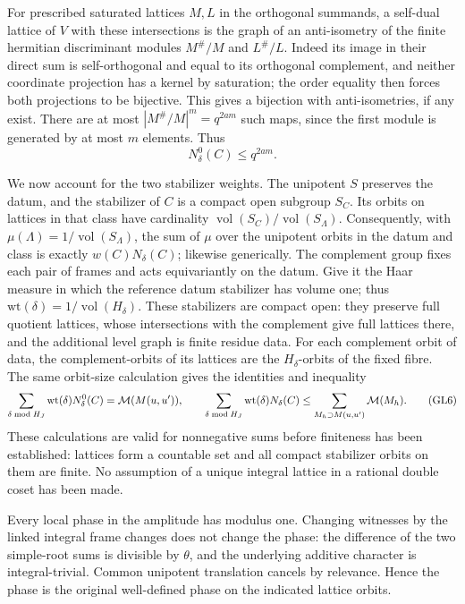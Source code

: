 For prescribed saturated lattices \(M,L\) in the orthogonal
summands, a self-dual lattice of \(V\) with these intersections
is the graph of an anti-isometry of the finite hermitian
discriminant modules \(M^\#/M\) and \(L^\#/L\).
Indeed its image in their direct sum is self-orthogonal
and equal to its orthogonal complement, and neither coordinate
projection has a kernel by saturation; the order equality
then forces both projections to be bijective.
This gives a bijection with anti-isometries, if any exist.
There are at most \(|M^\#/M|^m=q^{2am}\) such maps, since
the first module is generated by at most \(m\) elements.
Thus
\[
 N_\delta^0(C)\le q^{2am}. \tag{GL5}
\]

We now account for the two stabilizer weights. The unipotent
\(S\) preserves the datum, and the stabilizer of \(C\) is a
compact open subgroup \(S_C\). Its orbits on lattices in
that class have cardinality
\(\operatorname{vol}(S_C)/\operatorname{vol}(S_\Lambda)\).
Consequently, with \(\mu(\Lambda)=1/\operatorname{vol}(S_\Lambda)\),
the sum of \(\mu\) over the unipotent orbits in the datum and
class is exactly \(w(C)N_\delta(C)\); likewise generically.
The complement group fixes each pair of frames and acts
equivariantly on the datum. Give it the Haar measure in which
the reference datum stabilizer has volume one; thus
\(\mathrm{wt}(\delta)=1/\operatorname{vol}(H_\delta)\).
These stabilizers are compact open: they preserve full
quotient lattices, whose intersections with the complement
give full lattices there, and the additional level graph
is finite residue data. For each complement orbit of
data, the complement-orbits of its lattices are the
\(H_\delta\)-orbits of the fixed fibre. The same orbit-size
calculation gives the identities and inequality
\[
 \sum_{\delta\bmod H_J}\mathrm{wt}(\delta)N_\delta^0(C)
     ={\cal M}(M(u,u')),\qquad
 \sum_{\delta\bmod H_J}\mathrm{wt}(\delta)N_\delta(C)
     \le\sum_{M_h\supset M(u,u')}{\cal M}(M_h).
 \tag{GL6}
\]
These calculations are valid for nonnegative sums before
finiteness has been established: lattices form a countable
set and all compact stabilizer orbits on them are finite.
No assumption of a unique integral lattice in a rational
double coset has been made.

Every local phase in the amplitude has modulus one.
Changing witnesses by the linked integral frame changes does
not change the phase: the difference of the two simple-root
sums is divisible by \(\theta\), and the underlying additive
character is integral-trivial. Common unipotent translation
cancels by relevance. Hence the phase is the original
well-defined phase on the indicated lattice orbits.

